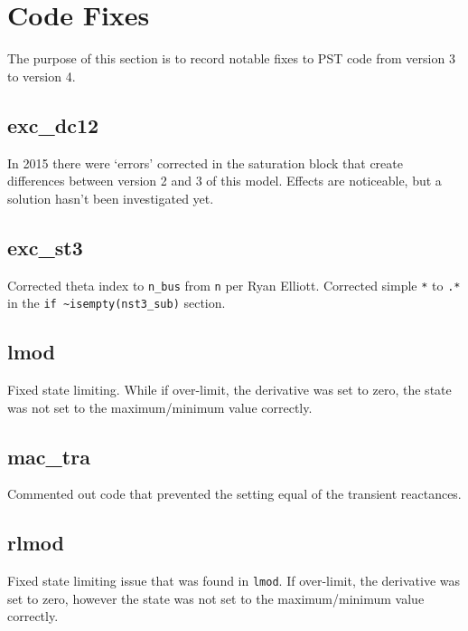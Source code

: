 \chapter{Code Fixes}
The purpose of this section is to record notable fixes to PST code from version 3 to version 4.

\section{exc\_dc12}  
In 2015 there were `errors' corrected in the saturation block that create differences between version 2 and 3 of this model.
Effects are noticeable, but a solution hasn't been investigated yet.

\section{exc\_st3}  
Corrected theta index to \verb|n_bus| from \verb|n| per Ryan Elliott.
Corrected simple \verb|*| to \verb|.*| in the \verb|if ~isempty(nst3_sub)| section.

\section{lmod}  
Fixed state limiting.
While if over-limit, the derivative was set to zero, the state was not set to the maximum/minimum value correctly.
 
\section{mac\_tra}  
Commented out code that prevented the setting equal of the transient reactances.

\section{rlmod}  
Fixed state limiting issue that was found in \verb|lmod|.
If over-limit, the derivative was set to zero, however the state was not set to the maximum/minimum value correctly.
